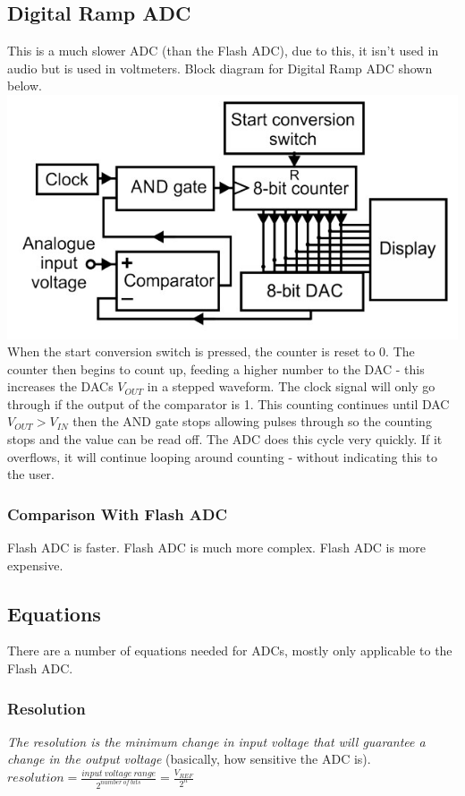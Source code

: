 \documentclass[a4paper,11pt, twocolumn]{article}
\begin{document}
\subsection{Digital Ramp ADC}
This is a much slower ADC (than the Flash ADC), due to this, it isn't used in audio but is used in voltmeters. Block diagram for Digital Ramp ADC shown below.
\includegraphics[width=\linewidth]{rampADC.jpg}
When the start conversion switch is pressed, the counter is reset to 0. The counter then begins to count up, feeding a higher number to the DAC - this increases the DACs $V_{OUT}$ in a stepped waveform. The clock signal will only go through if the output of the comparator is 1. This counting continues until DAC $V_{OUT} > V_{IN}$ then the AND gate stops allowing pulses through so the counting stops and the value can be read off. The ADC does this cycle very quickly. If it overflows, it will continue looping around counting - without indicating this to the user.
\subsubsection{Comparison With Flash ADC}
Flash ADC is faster. Flash ADC is much more complex. Flash ADC is more expensive.
\subsection{Equations}
There are a number of equations needed for ADCs, mostly only applicable to the Flash ADC.
\subsubsection{Resolution}
\textit{The resolution is the minimum change in input voltage that will guarantee a change in the output voltage} (basically, how sensitive the ADC is).
$\displaystyle resolution = \frac{input\ voltage\ range}{2^{number\ of\ bits}}= \frac{V_{REF}}{2^n}$\\
\end{document}
